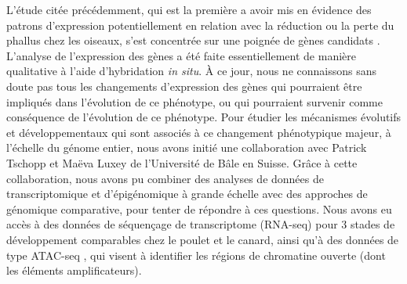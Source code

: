 L'étude citée précédemment, qui est la première a avoir mis en évidence des patrons d'expression potentiellement en relation avec la réduction ou la perte du phallus chez les oiseaux, s'est concentrée sur une poignée de gènes candidats \citep{herrera_developmental_2013}. L'analyse de l'expression des gènes a été faite essentiellement de manière qualitative à l’aide d’hybridation \textit{in situ}. \`A ce jour, nous ne connaissons sans doute pas tous les changements d'expression des gènes qui pourraient être impliqués dans l'évolution de ce phénotype, ou qui pourraient survenir comme conséquence de l'évolution de ce phénotype. Pour étudier les mécanismes évolutifs et développementaux qui sont associés à ce changement phénotypique majeur, à l'échelle du génome entier, nous avons initié une collaboration avec Patrick Tschopp et Maëva Luxey de l’Université de Bâle en Suisse. Grâce à cette collaboration, nous avons pu combiner des analyses de données de transcriptomique et d'épigénomique à grande échelle avec des approches de génomique comparative, pour tenter de répondre à ces questions. Nous avons eu accès à des données de séquençage de \gls{transcriptome} (RNA-seq) pour 3 stades de développement comparables chez le poulet et le canard, ainsi qu'à des données de type ATAC-seq \citep{buenrostro_transposition_2013}, qui visent à identifier les régions de chromatine ouverte (dont les éléments \glspl{amplificateur}). \\

